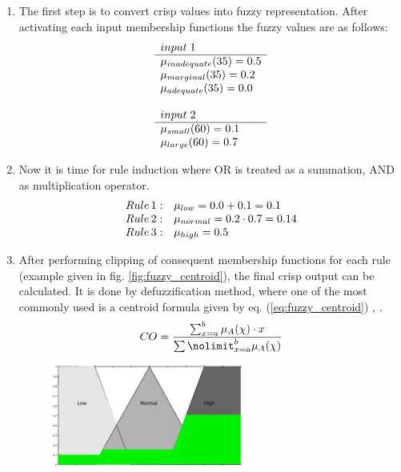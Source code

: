 \begin{enumerate}
    \item The first step is to convert crisp values into fuzzy representation.
        After activating each input membership functions the fuzzy values are as follows:
        $$
            \begin{array}[H]{l}
                input \;1 \\ \hline
                \mu_{inadequate}(35) = 0.5 \\
                \mu_{marginal}(35) = 0.2 \\
                \mu_{adequate}(35) = 0.0 \\ \\
                input \;2 \\ \hline
                \mu_{small}(60) = 0.1 \\
                \mu_{large}(60) = 0.7 \\ 
            \end{array}
        $$
    \item Now it is  time for rule induction where OR is treated as a summation, AND
        as multiplication operator. 
        $$
            \begin{array}[H]{ll}
                Rule \,1: & \mu_{low} = 0.0 + 0.1 = 0.1 \\
                Rule \,2: & \mu_{normal} = 0.2 \cdot 0.7 = 0.14 \\
                Rule \,3: & \mu_{high} = 0.5 \\
            \end{array}
        $$
    \item After performing clipping of consequent membership functions for each
        rule (example given in fig. \ref{fig:fuzzy_centroid}), the final crisp output can be calculated. It is done by
        defuzzification method, where one of the most commonly used is a centroid
        formula given by eq. (\ref{eq:fuzzy_centroid}) \cite{bib0}, \cite{bib1}.
        \begin{equation}
            CO = \frac{\sum\nolimits_{x=a}^{b}\mu_A(\chi)\cdot
            x}{\sum\nolimit_{x=a}^{b}\mu_A(\chi)}
            \label{eq:fuzzy_centroid}
        \end{equation}
        \begin{figure}[H]
            \begin{center}
                \includegraphics[width=0.6\textwidth, height=0.4\textwidth]{fig/fuzzy_centroid.png}

\end{center}
\end{figure}
\end{enumerate}
